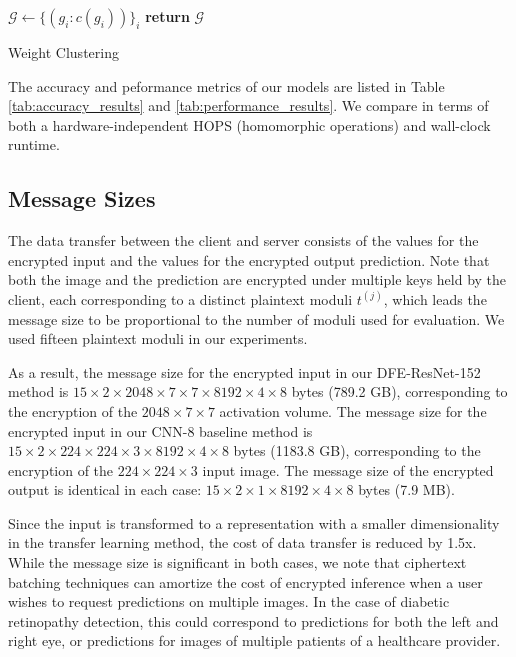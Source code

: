 \documentclass[conference]{IEEEtran}
\begin{document}
\begin{algorithm}
$\mathcal{G} \leftarrow \{(g_i: c(g_i))\}_i$\;
\textbf{return} $\mathcal{G}$\;
\caption{Weight Clustering}\label{algo_weightcluster}
\end{algorithm}\DecMargin{1em}

The accuracy and peformance metrics of our models are listed in Table \ref{tab:accuracy_results} and \ref{tab:performance_results}. We compare in terms of both a hardware-independent HOPS (homomorphic operations) and wall-clock runtime.


\subsection{Message Sizes}

The data transfer between the client and server consists of the values for the encrypted input and the values for the encrypted output prediction. Note that both the image and the prediction are encrypted under multiple keys held by the client, each corresponding to a distinct plaintext moduli $t^{(j)}$, which leads the message size to be proportional to the number of moduli used for  evaluation. We used fifteen plaintext moduli in our experiments.

As a result, the message size for the encrypted input in our DFE-ResNet-152 method is $15 \times 2 \times 2048 \times 7 \times 7 \times 8192 \times 4 \times 8$ bytes (789.2 GB), corresponding to the encryption of the $2048 \times 7 \times 7$ activation volume. The message size for the encrypted input in our CNN-8 baseline method is $15 \times 2 \times 224 \times 224 \times 3 \times 8192 \times 4 \times 8$ bytes (1183.8 GB), corresponding to the encryption of the $224 \times 224 \times 3$ input image. The message size of the encrypted output is identical in each case: $15 \times 2 \times 1 \times 8192 \times 4 \times 8$ bytes (7.9 MB).

Since the input is transformed to a representation with a smaller dimensionality in the transfer learning method, the cost of data transfer is reduced by 1.5x. While the message size is significant in both cases, we note that ciphertext batching techniques can amortize the cost of encrypted inference when a user wishes to request predictions on multiple images. In the case of diabetic retinopathy detection, this could correspond to predictions for both the left and right eye, or predictions for images of multiple patients of a healthcare provider.
\end{document}
